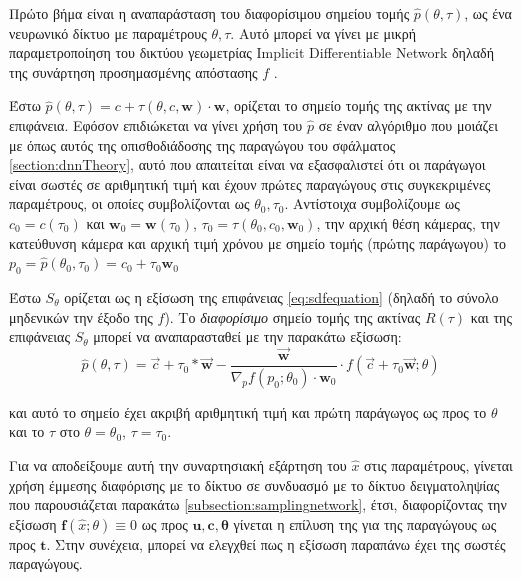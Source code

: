     Πρώτο βήμα είναι η αναπαράσταση του διαφορίσιμου σημείου τομής $\hat{p}(\theta, \tau)$, ως ένα νευρωνικό δίκτυο με παραμέτρους $\theta, \tau$. Αυτό μπορεί να γίνει με μικρή παραμετροποίηση του δικτύου γεωμετρίας Implicit Differentiable Network δηλαδή της συνάρτηση προσημασμένης απόστασης \textbf{$f$} . 

    Έστω $\hat{p}(\theta,\tau) = c+\tau(\theta,c,\boldsymbol{w})\cdot \boldsymbol{w}$, ορίζεται το σημείο τομής της ακτίνας με την επιφάνεια. Εφόσον επιδιώκεται να γίνει χρήση του $\hat{p}$ σε έναν αλγόριθμο που μοιάζει με  όπως αυτός της οπισθοδιάδοσης της παραγώγου του σφάλματος \ref{section:dnnTheory}, αυτό που απαιτείται είναι να εξασφαλιστεί ότι οι παράγωγοι είναι σωστές σε αριθμητική τιμή και έχουν πρώτες παραγώγους στις συγκεκριμένες παραμέτρους, οι οποίες συμβολίζονται ως $\theta_{0},\tau_{0}$. Αντίστοιχα συμβολίζουμε ως $c_{0} = c(\tau_{0})$ και $\boldsymbol{w}_{0} = \boldsymbol{w}(\tau_{0})$, $\tau_{0} = \tau(\theta_{0},c_{0},\boldsymbol{w}_{0})$, την αρχική θέση κάμερας, την κατεύθυνση κάμερα και αρχική τιμή χρόνου με σημείο τομής (πρώτης παράγωγου) το $p_0 = \hat{p}(\theta_0,\tau_0) = c_0 + \tau_{0}\boldsymbol{w}_{0}$

\begin{lemma}
    Έστω $S_\theta$ ορίζεται ως η εξίσωση της επιφάνειας \ref{eq:sdfequation} (δηλαδή το σύνολο μηδενικών την έξοδο της \textbf{$f$}). Το \textit{διαφορίσιμο} σημείο τομής της ακτίνας $R(\tau)$ και της επιφάνειας $S_\theta$ μπορεί να αναπαρασταθεί με την παρακάτω εξίσωση: 
    \begin{equation}
         \hat{p}(\theta, \tau)=\vec{c}+\tau_0*\vec{\boldsymbol{w}}-\frac{\vec{\boldsymbol{w}}}{\nabla_p{f(p_0;\theta_0)\cdot \boldsymbol{w}_{0}}}\cdot f(\vec{c} + \tau_{0}\vec{\boldsymbol{w}};\theta) 
         \label{eq:differentiableRendering}
    \end{equation}
\end{lemma}
    και αυτό το σημείο έχει ακριβή αριθμητική τιμή και  πρώτη  παράγωγος ως προς το $\theta$  και το $\tau$ στο $\theta = \theta_0$, $\tau = \tau_0$.
    
    Για να αποδείξουμε αυτή την συναρτησιακή εξάρτηση του $\hat{x}$ στις παραμέτρους, γίνεται χρήση έμμεσης διαφόρισης με το δίκτυο σε συνδυασμό με το δίκτυο δειγματοληψίας που παρουσιάζεται παρακάτω  \ref{subsection:samplingnetwork}, έτσι, διαφορίζοντας την εξίσωση $\mathbf{f}(\hat{x};\theta)\equiv 0$  ως προς $\mathbf{u}, \mathbf{c}, \mathbf{\theta}$ γίνεται η επίλυση της για της παραγώγους ως προς $\mathbf{t}$. Στην συνέχεια, μπορεί να ελεγχθεί πως η εξίσωση παραπάνω έχει της σωστές παραγώγους.
